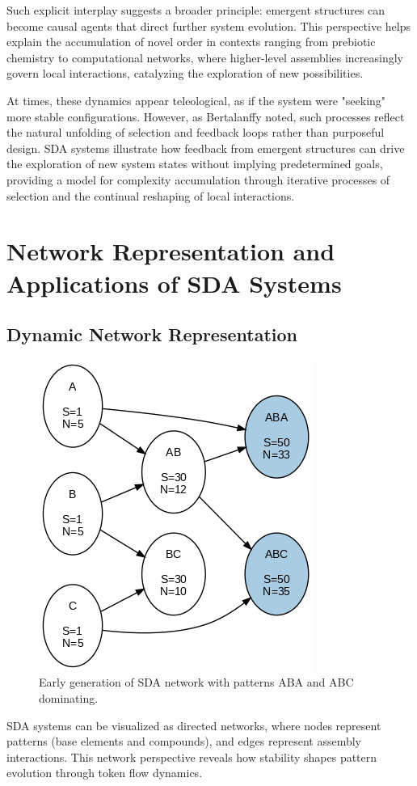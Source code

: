 \documentclass[preprint,12pt]{elsarticle}
\begin{document}
Such explicit interplay suggests a broader principle: emergent structures can become causal agents that direct further system evolution. This perspective helps explain the accumulation of novel order in contexts ranging from prebiotic chemistry to computational networks, where higher-level assemblies increasingly govern local interactions, catalyzing the exploration of new possibilities.

At times, these dynamics appear teleological, as if the system were "seeking" more stable configurations. However, as Bertalanffy \cite{bertalanffy1968general} noted, such processes reflect the natural unfolding of selection and feedback loops rather than purposeful design. SDA systems illustrate how feedback from emergent structures can drive the exploration of new system states without implying predetermined goals, providing a model for complexity accumulation through iterative processes of selection and the continual reshaping of local interactions.

\section{Network Representation and Applications of SDA Systems}

\subsection{Dynamic Network Representation}

\begin{figure}[h]
    \centering
    \includegraphics[width=0.4\linewidth]{figure_11.png}
    \caption{Early generation of SDA network with patterns ABA and ABC dominating.}
    \label{fig:figure_11}
\end{figure}

SDA systems can be visualized as directed networks, where nodes represent patterns (base elements and compounds), and edges represent assembly interactions. This network perspective reveals how stability shapes pattern evolution through token flow dynamics.
\end{document}
